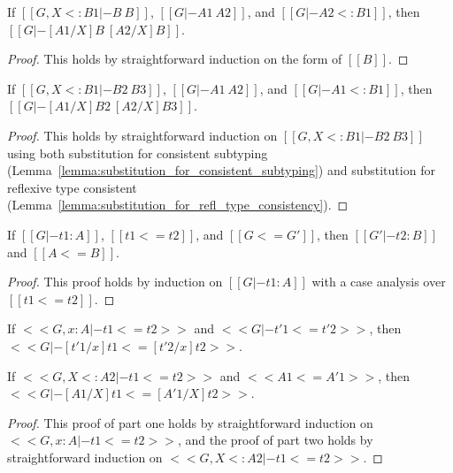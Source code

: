 \begin{lemma}
  \label{lemma:substitution_for_refl_type_consistency}
  If $[[G, X <: B1 |- B ~ B]]$, $[[G |- A1 ~ A2]]$, and $[[G |- A2 <: B1]]$, then $[[G |- [A1/X]B ~ [A2/X]B]]$.
\end{lemma}
\begin{proof}
  This holds by straightforward induction on the form of $[[B]]$.
\end{proof}

\begin{lemma}
  \label{lemma:substitution_for_type_consistency}
  If $[[G, X <: B1 |- B2 ~ B3]]$, $[[G |- A1 ~ A2]]$, and $[[G |- A1 <: B1]]$, then $[[G |- [A1/X]B2 ~ [A2/X]B3]]$.
\end{lemma}
\begin{proof}
  This holds by straightforward induction on $[[G, X <: B1 |- B2 ~
      B3]]$ using both substitution for consistent subtyping
  (Lemma~\ref{lemma:substitution_for_consistent_subtyping}) and
  substitution for reflexive type consistent
  (Lemma~\ref{lemma:substitution_for_refl_type_consistency}).
  
\end{proof}

\begin{lemma}
  \label{lemma:typing_for_type_precision}
  If $[[G |- t1 : A]]$, $[[t1 <= t2]]$, and $[[G <= G']]$, then $[[G' |- t2 : B]]$ and $[[A <= B]]$.
\end{lemma}
\begin{proof}
  This proof holds by induction on $[[G |- t1 : A]]$ with a case analysis over $[[t1 <= t2]]$.
\end{proof}

\begin{lemma}
  \label{lemma:substitution_for_term_precision}
  \begin{enumR}
  \item[] 
  \item If $<<G, x : A |- t1 <= t2>>$ and $<<G |- t'1 <= t'2>>$, then $<<G |- [t'1/x]t1 <= [t'2/x]t2>>$.
  \item If $<<G, X <: A2 |- t1 <= t2>>$ and $<<A1 <= A'1>>$, then $<<G |- [A1/X]t1 <= [A'1/X]t2>>$.
  \end{enumR}
\end{lemma}
\begin{proof}
  This proof of part one holds by straightforward induction on $<<G, x : A |- t1 <= t2>>$, and the
  proof of part two holds by straightforward induction on $<<G, X <: A2 |- t1 <= t2>>$.
\end{proof}

